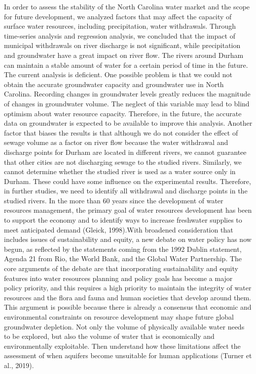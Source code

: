 \documentclass[
  12pt,
]{article}
\begin{document}
In order to assess the stability of the North Carolina water market and
the scope for future development, we analyzed factors that may affect
the capacity of surface water resources, including precipitation, water
withdrawals. Through time-series analysis and regression analysis, we
concluded that the impact of municipal withdrawals on river discharge is
not significant, while precipitation and groundwater have a great impact
on river flow. The rivers around Durham can maintain a stable amount of
water for a certain period of time in the future. The current analysis
is deficient. One possible problem is that we could not obtain the
accurate groundwater capacity and groundwater use in North Carolina.
Recording changes in groundwater levels greatly reduces the magnitude of
changes in groundwater volume. The neglect of this variable may lead to
blind optimism about water resource capacity. Therefore, in the future,
the accurate data on groundwater is expected to be available to improve
this analysis. Another factor that biases the results is that although
we do not consider the effect of sewage volume as a factor on river flow
because the water withdrawal and discharge points for Durham are located
in different rivers, we cannot guarantee that other cities are not
discharging sewage to the studied rivers. Similarly, we cannot determine
whether the studied river is used as a water source only in Durham.
These could have some influence on the experimental results. Therefore,
in further studies, we need to identify all withdrawal and discharge
points in the studied rivers. In the more than 60 years since the
development of water resources management, the primary goal of water
resources development has been to support the economy and to identify
ways to increase freshwater supplies to meet anticipated demand (Gleick,
1998).With broadened consideration that includes issues of
sustainability and equity, a new debate on water policy has now begun,
as reflected by the statements coming from the 1992 Dublin statement,
Agenda 21 from Rio, the World Bank, and the Global Water Partnership.
The core arguments of the debate are that incorporating sustainability
and equity features into water resources planning and policy goals has
become a major policy priority, and this requires a high priority to
maintain the integrity of water resources and the flora and fauna and
human societies that develop around them. This argument is possible
because there is already a consensus that economic and environmental
constraints on resource development may shape future global groundwater
depletion. Not only the volume of physically available water needs to be
explored, but also the volume of water that is economically and
environmentally exploitable. Then understand how these limitations
affect the assessment of when aquifers become unsuitable for human
applications (Turner et al., 2019).
\end{document}
